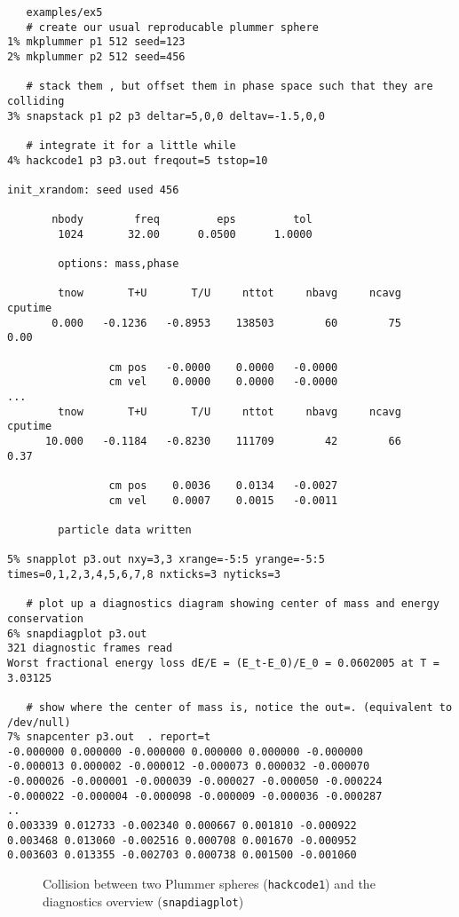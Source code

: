 \footnotesize\begin{verbatim}
   examples/ex5
   # create our usual reproducable plummer sphere
1% mkplummer p1 512 seed=123
2% mkplummer p2 512 seed=456

   # stack them , but offset them in phase space such that they are colliding
3% snapstack p1 p2 p3 deltar=5,0,0 deltav=-1.5,0,0 

   # integrate it for a little while
4% hackcode1 p3 p3.out freqout=5 tstop=10
 
init_xrandom: seed used 456
 
       nbody        freq         eps         tol
        1024       32.00      0.0500      1.0000
 
        options: mass,phase
 
        tnow       T+U       T/U     nttot     nbavg     ncavg   cputime
       0.000   -0.1236   -0.8953    138503        60        75      0.00
 
                cm pos   -0.0000    0.0000   -0.0000
                cm vel    0.0000    0.0000   -0.0000
...
        tnow       T+U       T/U     nttot     nbavg     ncavg   cputime
      10.000   -0.1184   -0.8230    111709        42        66      0.37
 
                cm pos    0.0036    0.0134   -0.0027
                cm vel    0.0007    0.0015   -0.0011
 
        particle data written

5% snapplot p3.out nxy=3,3 xrange=-5:5 yrange=-5:5 times=0,1,2,3,4,5,6,7,8 nxticks=3 nyticks=3

   # plot up a diagnostics diagram showing center of mass and energy conservation
6% snapdiagplot p3.out
321 diagnostic frames read
Worst fractional energy loss dE/E = (E_t-E_0)/E_0 = 0.0602005 at T = 3.03125

   # show where the center of mass is, notice the out=. (equivalent to /dev/null)
7% snapcenter p3.out  . report=t
-0.000000 0.000000 -0.000000 0.000000 0.000000 -0.000000
-0.000013 0.000002 -0.000012 -0.000073 0.000032 -0.000070
-0.000026 -0.000001 -0.000039 -0.000027 -0.000050 -0.000224
-0.000022 -0.000004 -0.000098 -0.000009 -0.000036 -0.000287
..
0.003339 0.012733 -0.002340 0.000667 0.001810 -0.000922
0.003468 0.013060 -0.002516 0.000708 0.001670 -0.000952
0.003603 0.013355 -0.002703 0.000738 0.001500 -0.001060

\end{verbatim}\normalsize

\begin{figure}[h!]
\caption[Collision between two Plummer spheres]
{Collision between two Plummer spheres ({\tt hackcode1}) 
and the diagnostics overview ({\tt snapdiagplot})
}
\label{f:coll}
\end{figure}


